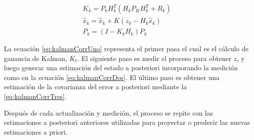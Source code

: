 \begin{eqnarray}
\label{eq:kalmanCorrUno}
K_k = P_kH^{T}_k(H_kP_KH^{T}_k + R_k)\\
\label{eq:kalmanCorrDos}
\hat{x}_k = \hat{x}_k + K(z_k - H_k \hat{x}_k)\\
\label{eq:kalmanCorrTres}
P_k = (I - K_kH_k)P_k
\end{eqnarray}

La ecuación \eqref{eq:kalmanCorrUno} representa el primer pasa el cual es el cálculo de ganancia de Kalman, $K_t$. El siguiente paso es medir el proceso para obtener $z$, y luego generar una estimación del estado a posteriori incorporando la medición como en la ecuación \eqref{eq:kalmanCorrDos}. El último paso es obtener una estimación de la covarianza del error a posteriori mediante la \eqref{eq:kalmanCorrTres}.

Después de cada actualización y medición, el proceso se repite con las estimaciones a posteriori anteriores utilizadas para proyectar o predecir las nuevas estimaciones a priori.

